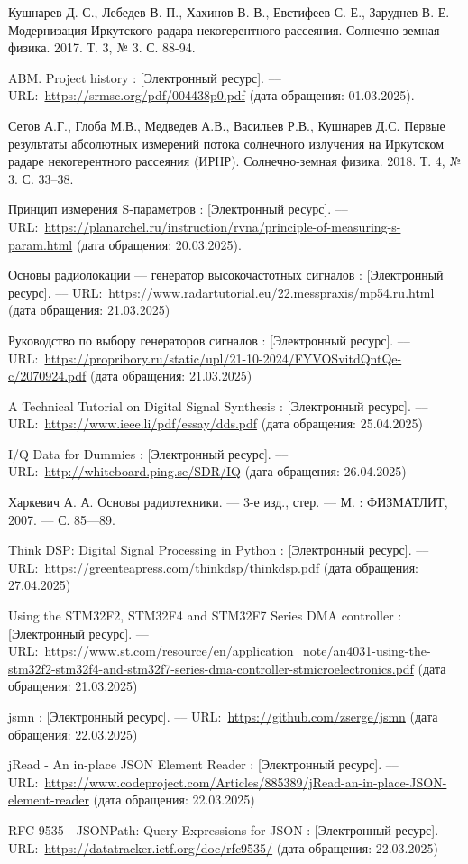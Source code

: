 \documentclass{report}
\begin{document}
\begin{thebibliography}{}

 Кушнарев Д. С., Лебедев В. П., Хахинов В. В., Евстифеев С. Е., Заруднев В. Е. Модернизация Иркутского радара некогерентного рассеяния. Солнечно-земная физика. 2017. Т. 3, № 3. С. 88-94.

 ABM. Project history : [Электронный ресурс]. --– URL:~\url{https://srmsc.org/pdf/004438p0.pdf} (дата обращения: 01.03.2025).

 Сетов А.Г., Глоба М.В., Медведев А.В., Васильев Р.В., Кушнарев Д.С. Первые результаты абсолютных измерений потока
солнечного излучения на Иркутском радаре некогерентного рассеяния (ИРНР). Солнечно-земная физика. 2018. Т. 4, № 3. С. 33–38.

 Принцип измерения S-параметров : [Электронный ресурс]. --– URL:~\url{https://planarchel.ru/instruction/rvna/principle-of-measuring-s-param.html} (дата обращения: 20.03.2025).

 Основы радиолокации --- генератор высокочастотных сигналов : [Электронный ресурс]. --– URL:~\url{https://www.radartutorial.eu/22.messpraxis/mp54.ru.html} (дата обращения: 21.03.2025)

 Руководство по выбору генераторов сигналов : [Электронный ресурс]. --– URL:~\url{https://propribory.ru/static/upl/21-10-2024/FYVOSvitdQntQe-c/2070924.pdf} (дата обращения: 21.03.2025)

 A Technical Tutorial on Digital Signal Synthesis : [Электронный ресурс]. --– URL:~\url{https://www.ieee.li/pdf/essay/dds.pdf} (дата обращения: 25.04.2025)

 I/Q Data for Dummies : [Электронный ресурс]. --– URL:~\url{http://whiteboard.ping.se/SDR/IQ} (дата обращения: 26.04.2025)

 Харкевич А. А. Основы радиотехники. --- 3-е изд., стер. --- М. : ФИЗМАТЛИТ, 2007. --- С. 85---89.

 Think DSP: Digital Signal Processing in Python : [Электронный ресурс]. --– URL:~\url{https://greenteapress.com/thinkdsp/thinkdsp.pdf} (дата обращения: 27.04.2025)

 Using the STM32F2, STM32F4 and STM32F7 Series DMA controller : [Электронный ресурс]. --– URL:~\url{https://www.st.com/resource/en/application_note/an4031-using-the-stm32f2-stm32f4-and-stm32f7-series-dma-controller-stmicroelectronics.pdf} (дата обращения: 21.03.2025)

 jsmn : [Электронный ресурс]. --– URL:~\url{https://github.com/zserge/jsmn} (дата обращения: 22.03.2025)

 jRead - An in-place JSON Element Reader : [Электронный ресурс]. --– URL:~\url{https://www.codeproject.com/Articles/885389/jRead-an-in-place-JSON-element-reader} (дата обращения: 22.03.2025)

 RFC 9535 - JSONPath: Query Expressions for JSON : [Электронный ресурс]. --– URL:~\url{https://datatracker.ietf.org/doc/rfc9535/} (дата обращения: 22.03.2025)

\end{thebibliography}
\end{document}
